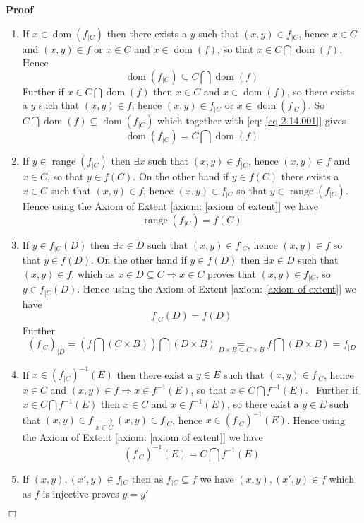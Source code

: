 \documentclass{book}
\newcommand{\Rightarrowlim}{\mathop{\rightarrow}\limits}
\newcommand{\equallim}{\mathop{=}\limits}
\newcommand{\tmop}[1]{\ensuremath{\operatorname{#1}}}
\newenvironment{proof}{\noindent\textbf{Proof\ }}{\hspace*{\fill}$\Box$\medskip}
\begin{document}
\begin{proof}
  
  \begin{enumerate}
    \item If $x \in \tmop{dom} (f_{|C})$ then there exists a $y$ such that
    $(x, y) \in f_{|C}$, hence $x \in C$ and $(x, y) \in f$ or $x \in C$ and
    $x \in \tmop{dom} (f)$, so that $x \in C \bigcap \tmop{dom} (f)$. Hence
    \begin{equation}
      \label{eq 2.14.001} \tmop{dom} (f_{|C}) \subseteq C \bigcap \tmop{dom}
      (f)
    \end{equation}
    Further if $x \in C \bigcap \tmop{dom} (f)$ then $x \in C$ and $x \in
    \tmop{dom} (f)$, so there exists a $y$ such that $(x, y) \in f$, hence
    $(x, y) \in f_{|C}$ or $x \in \tmop{dom} (f_{|C})$. So $C \bigcap
    \tmop{dom} (f) \subseteq \tmop{dom} (f_{|C})$ which together with [eq:
    \ref{eq 2.14.001}] gives
    \[ \tmop{dom} (f_{|C}) = C \bigcap \tmop{dom} (f) \]
    \item If $y \in \tmop{range} (f_{|C})$ then $\exists x$ such that $(x, y)
    \in f_{|C}$, hence $(x, y) \in f$ and $x \in C$, so that $y \in f (C)$. On
    the other hand if $y \in f (C)$ there exists a $x \in C$ such that $(x, y)
    \in f$, hence $(x, y) \in f_{|C}$ so that $y \in \tmop{range} (f_{|C})$.
    Hence using the Axiom of Extent [axiom: \ref{axiom of extent}] we have
    \[ \tmop{range} (f_{|C}) = f (C) \]
    \item If $y \in f_{|C} (D)$ then $\exists x \in D$ such that $(x, y) \in
    f_{|C}$, hence $(x, y) \in f$ so that $y \in f (D)$. On the other hand if
    $y \in f (D)$ then $\exists x \in D$ such that $(x, y) \in f$, which as $x
    \in D \subseteq C \Rightarrow x \in C$ proves that $(x, y) \in f_{|C}$, so
    $y \in f_{|C} (D)$. Hence using the Axiom of Extent [axiom: \ref{axiom of
    extent}] we have
    \[ f_{|C} (D) = f (D) \]
    Further
    \[ (f_{|C})_{|D} = \left( f \bigcap (C \times B) \right) \bigcap (D
       \times B) \equallim_{D \times B \subseteq C \times B} f \bigcap (D
       \times B) = f_{|D} \]
    \item If $x \in (f_{|C})^{- 1} (E)$ then there exist a $y \in E$ such that
    $(x, y) \in f_{|C}$, hence $x \in C$ and $(x, y) \in f \Rightarrow x \in
    f^{- 1} (E)$, so that $x \in C \bigcap f^{- 1} (E)$. \ Further if $x \in C
    \bigcap f^{- 1} (E)$ then $x \in C$ and $x \in f^{- 1} (E)$, so there
    exist a $y \in E$ such that $(x, y) \in f \Rightarrowlim_{x \in C} (x, y)
    \in f_{|C}$, hence $x \in (f_{|C})^{- 1} (E)$. Hence using the Axiom of
    Extent [axiom: \ref{axiom of extent}] we have
    \[ (f_{|C})^{- 1} (E) = C \bigcap f^{- 1} (E) \]
    \item If $(x, y), (x', y) \in f_{|C}$ then as $f_{|C} \subseteq f$ we have
    $ (x, y), (x', y) \in f$ which as $f$ is injective proves $y = y'$
    

\end{enumerate}
\end{proof}
\end{document}
